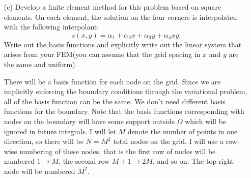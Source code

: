\documentclass[11pt, titlepage]{article}
\begin{document}
\begin{enumerate}
\begin{enumerate}
      \item[(c)]
        Develop a finite element method for this problem based on square elements.
        On each element, the solution on the four corners is interpolated with the
        following interpolant:
        \[
          s(x, y) = \alpha_1 + \alpha_2 x + \alpha_3 y + \alpha_4 x y.
        \]
        Write out the basis functions and explicitly write out the linear system
        that arises from your FEM(you can assume that the grid spacing in $x$
        and $y$ are the same and uniform).

        There will be a basis function for each node on the grid.
        Since we are implicitly enforcing the boundary conditions through the
        variational problem, all of the basis function can be the same.
        We don't need different basis functions for the boundary.
        Note that the basis functions corresponding with nodes on the boundary
        will have some support outside $\Omega$ which will be ignored in
        future integrals.
        I will let $M$ denote the number of points in one direction, so there
        will be $N = M^2$ total nodes on the grid.
        I will use a row-wise numbering of these nodes, that is the first row of
        nodes will be numbered $1 \to M$, the second row $M+1 \to 2M$, and so on.
        The top right node will be numbered $M^2$.


\end{enumerate}
\end{enumerate}
\end{document}
